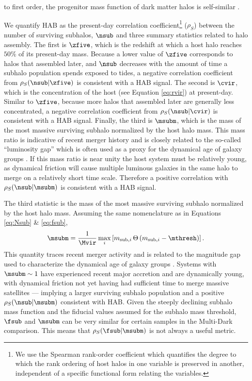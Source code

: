 to first order, the progenitor mass function of dark matter halos is self-similar \citep{Yang.etal.11, Jiang.vdBosch.16}.

We quantify HAB as the present-day correlation coefficient\footnote{We use the Spearman rank-order coefficient which quantifies the degree to which the rank ordering of host halos in one variable is preserved in another, independent of a specific functional form relating the variables.} ($\rho_S$) between the number of surviving subhalos, $\nsub$ and three summary statistics related to halo assembly. The first is $\zfive$, which is the redshift at which a host halo reaches $50\%$ of its present-day mass. Because a lower value of $\zfive$ corresponds to halos that assembled later, and $\nsub$ decreases with the amount of time a subhalo population spends exposed to tides, a negative correlation coefficient from $\rho_S(\nsub | \zfive)$ is consistent with a HAB signal. The second is $\cvir$, which is the concentration of the host (see Equation \ref{eq:rvir}) at present-day. Similar to $\zfive$, because more halos that assembled later are generally less concentrated, a negative correlation coefficient from $\rho_S(\nsub | \cvir)$ is consistent with a HAB signal. Finally, the third is $\msubm$, which is the mass of the most massive surviving subhalo normalized by the host halo mass. This mass ratio is indicative of recent merger history and is closely related to the so-called ``luminosity gap'' which is often used as a proxy for the dynamical age of galaxy groups \citep{vdBosch.etal.07, Dariush.etal.2010, Nadler.etal.23}. If this mass ratio is near unity the host system must be relatively young, as dynamical friction will cause multiple luminous galaxies in the same halo to merge on a relatively short time scale. Therefore a positive correlation with $\rho_S(\nsub | \msubm)$ is consistent with a HAB signal.

The third statistic is the mass of the most massive surviving subhalo normalized by the host halo mass. Assuming the same nomenclature as in Equations \ref{eq:Nsub} \& \ref{eq:fsub}, 
%
\begin{equation}
\msubm = \frac{1}{\Mvir} \max_{i} \left[ m_{{\rm sub},i}\, \Theta \left(m_{{\rm sub},i} - \mthresh \right) \right].
\label{eq:msubm}
\end{equation}
%
This quantity traces recent merger activity and is related to the magnitude gap used to characterize the dynamical age of galaxy groups \citep{vdBosch.etal.07, Dariush.etal.2010, Nadler.etal.23}. Systems with $\msubm \sim 1$ have experienced recent major accretion and are dynamically young, with dynamical friction not yet having had sufficient time to merge massive satellites — implying a larger surviving subhalo population and a positive $\rho_S(\nsub | \msubm)$ consistent with HAB. Given the steeply declining subhalo mass function and the fiducial values assumed for the subhalo mass threshold, $\fsub$ and $\msubm$ can be very similar for certain samples in the Multi-Dark comparison. This means that $\rho_S(\fsub | \msubm)$ is not always a useful metric.


